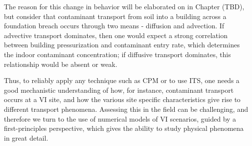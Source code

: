 The reason for this change in behavior will be elaborated on in Chapter (TBD), but consider that contaminant transport from soil into a building across a foundation breach occurs through two means - diffusion and advection. %
If advective transport dominates, then one would expect a strong correlation between building pressurization and contaminant entry rate, which determines the indoor contaminant concentration; if diffusive transport dominates, this relationship would be absent or weak.\par

Thus, to reliably apply any technique such as CPM or to use ITS, one needs a good mechanistic understanding of how, for instance, contaminant transport occurs at a VI site, and how the various site specific characteristics give rise to different transport phenomena.
Assessing this in the field can be challenging, and therefore we turn to the use of numerical models of VI scenarios, guided by a first-principles perspective, which gives the ability to study physical phenomena in great detail.\par
